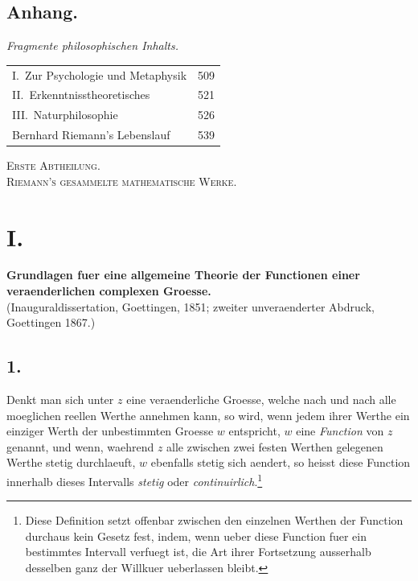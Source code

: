 \documentclass[11pt,a4paper]{article}
\theoremstyle{plain}
\theoremstyle{definition}
\begin{document}
\subsection*{Anhang.}

\textit{Fragmente philosophischen Inhalts.}

\begin{longtable}{p{12cm}r}
I.\ Zur Psychologie und Metaphysik & 509\\
II.\ Erkenntnisstheoretisches & 521\\
III.\ Naturphilosophie & 526\\[0.5em]
Bernhard Riemann's Lebenslauf & 539\\
\end{longtable}

\clearpage

\begin{center}
{\Large\textsc{Erste Abtheilung.}}\\[1em]
{\large\textsc{Riemann's gesammelte mathematische Werke.}}
\end{center}

\clearpage

\section*{I.}

\begin{center}
{\Large\textbf{Grundlagen fuer eine allgemeine Theorie der Functionen einer veraenderlichen complexen Groesse.}}\\[0.5em]
(Inauguraldissertation, Goettingen, 1851; zweiter unveraenderter Abdruck, Goettingen 1867.)
\end{center}

\subsection*{1.}

Denkt man sich unter $z$ eine veraenderliche Groesse, welche nach und nach alle moeglichen reellen Werthe annehmen kann, so wird, wenn jedem ihrer Werthe ein einziger Werth der unbestimmten Groesse $w$ entspricht, $w$ eine \emph{Function} von $z$ genannt, und wenn, waehrend $z$ alle zwischen zwei festen Werthen gelegenen Werthe stetig durchlaeuft, $w$ ebenfalls stetig sich aendert, so heisst diese Function innerhalb dieses Intervalls \emph{stetig} oder \emph{continuirlich}.\footnote{Diese Definition setzt offenbar zwischen den einzelnen Werthen der Function durchaus kein Gesetz fest, indem, wenn ueber diese Function fuer ein bestimmtes Intervall verfuegt ist, die Art ihrer Fortsetzung ausserhalb desselben ganz der Willkuer ueberlassen bleibt.}
\end{document}
